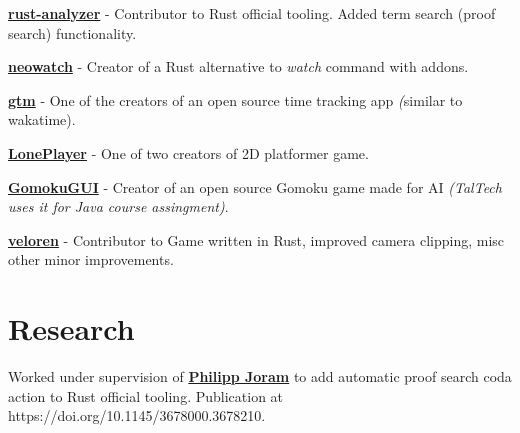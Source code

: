 \documentclass[letterpaper]{deedy-resume} %
\begin{document}
\begin{minipage}[t]{0.66\textwidth}
\begin{tightitemize}
  \item \textbf{\href{https://github.com/rust-lang/rust-analyzer}{rust-analyzer}} - Contributor to Rust official tooling. Added term search (proof search) functionality.
  \item \textbf{\href{https://github.com/kilpkonn/neowatch}{neowatch}} - Creator of a Rust alternative to \textit{watch} command with addons.
  \item \textbf{\href{https://github.com/DEVELOPEST}{gtm}} - One of the creators of an open source time tracking app \textit(similar to wakatime).
  \item \textbf{\href{https://github.com/kilpkonn/LonePlayer}{LonePlayer}} - One of two creators of 2D platformer game.
  \item \textbf{\href{https://github.com/kilpkonn/GomokuGUI}{GomokuGUI}} - Creator of an open source Gomoku game made for AI \textit{(TalTech uses it for Java course assingment)}.
  \item \textbf{\href{https://veloren.net/}{veloren}} - Contributor to Game written in Rust, improved camera clipping, misc other minor improvements.
\end{tightitemize}

\sectionspace %


\section{Research}


Worked under supervision of \textbf{\href{https://taltech.ee/en/contacts/philipp-joram}{Philipp Joram}} to add automatic proof search coda action to Rust official tooling. Publication at https://doi.org/10.1145/3678000.3678210.

\sectionspace %


%
%


\end{minipage}
\end{document}
